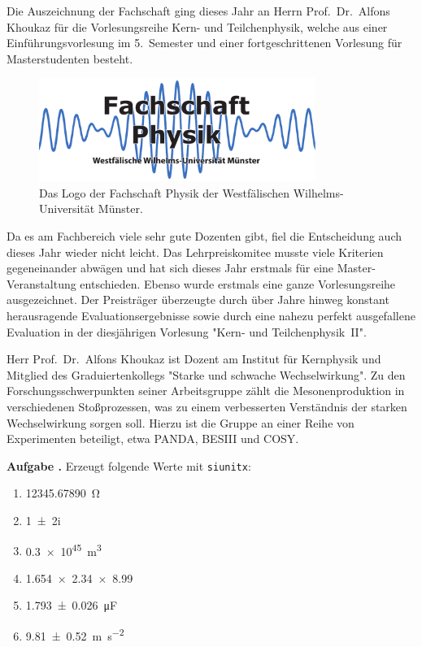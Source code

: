 \documentclass[a4paper, 12pt, headsepline, parskip=half-, headlines=3.1]{scrartcl}
\newcounter{aufgabe}
\newenvironment{aufgabe}[1][]{\stepcounter{aufgabe}
\noindent\textbf{Aufgabe \arabic{aufgabe}.} #1\par
\begin{enumerate}[label=\alph*)]}{\end{enumerate}\bigskip}
\begin{document}
Die Auszeichnung der Fachschaft ging dieses Jahr an Herrn Prof.\ Dr.~Alfons Khoukaz für die Vorlesungsreihe Kern- und Teilchenphysik, welche aus einer Einführungsvorlesung im 5.~Semester und einer fortgeschrittenen Vorlesung für Masterstudenten besteht.

\begin{figure}
	\centering
	\includegraphics[width=9cm]{res/logo.pdf}
	\caption{Das Logo der Fachschaft Physik der Westfälischen Wilhelms-Universität Münster.}
\end{figure}
Da es am Fachbereich viele sehr gute Dozenten gibt, fiel die Entscheidung auch dieses Jahr wieder nicht leicht.
Das Lehrpreiskomitee musste viele Kriterien gegeneinander abwägen und hat sich dieses Jahr erstmals für eine Master-Veranstaltung entschieden.
Ebenso wurde erstmals eine ganze Vorlesungsreihe ausgezeichnet.
Der Preisträger überzeugte durch über Jahre hinweg konstant herausragende Evaluationsergebnisse sowie durch eine nahezu perfekt ausgefallene Evaluation in der diesjährigen Vorlesung "Kern- und Teilchenphysik~II".

\enlargethispage{\baselineskip}

Herr Prof.\ Dr.~Alfons Khoukaz ist Dozent am Institut für Kernphysik und Mitglied des Graduiertenkollegs "Starke und schwache Wechselwirkung".
Zu den Forschungsschwerpunkten seiner Arbeitsgruppe zählt die Mesonenproduktion in verschiedenen Stoßprozessen, was zu einem verbesserten Verständnis der starken Wechselwirkung sorgen soll.
Hierzu ist die Gruppe an einer Reihe von Experimenten beteiligt, etwa PANDA, BESIII und COSY.

\begin{aufgabe}[Erzeugt folgende Werte mit \texttt{siunitx}:]
	\item \SI{12345,67890}{\ohm}
	\item \num{1 +- 2i}
	\item \SI{.3e45}{\m\cubed}
	\item \num{1.654 x 2.34 x 8,99}
	\item \SI{1,793 +- 0,026}{\micro\F}
	\item \SI{9,81 +- 0,52}{\m\per\s\squared}
\end{aufgabe}
\end{document}
